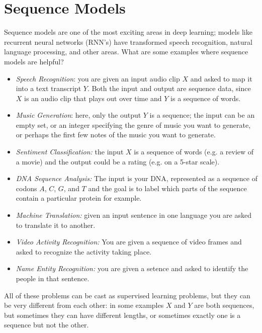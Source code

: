 \documentclass[12pt]{article}
\begin{document}
\section{Sequence Models}
Sequence models are one of the most exciting areas in deep learning; models like recurrent neural networks (RNN's) have transformed speech recognition, natural language processing, and other areas. What are some examples where sequence models are helpful?
\begin{itemize}
\item \emph{Speech Recognition}: you are given an input audio clip $X$ and asked to map it into a text transcript $Y$. Both the input and output are sequence data, since $X$ is an audio clip that plays out over time and $Y$ is a sequence of words.
\item \emph{Music Generation}: here, only the output $Y$ is a sequence; the input can be an empty set, or an integer specifying the genre of music you want to generate, or perhaps the first few notes of the music you want to generate.
\item \emph{Sentiment Classification:} the input $X$ is a sequence of words (e.g. a review of a movie) and the output could be a rating (e.g. on a 5-star   scale).
\item \emph{DNA Sequence Analysis:} The input is your DNA, represented as a sequence of codons $A$, $C$, $G$, and $T$ and the goal is to label which parts of the sequence contain a particular protein for example.
\item \emph{Machine Translation:} given an input sentence in one language you are asked to translate it to another.
\item \emph{Video Activity Recognition:} You are given a sequence of video   frames and asked to recognize the activity taking place.
\item \emph{Name Entity Recognition:} you are given a setence and asked to identify the people in that sentence.
\end{itemize}
All of these problems can be cast as supervised learning problems, but they can be very different from each other: in some examples $X$ and $Y$ are both sequences, but sometimes they can have different lengths, or sometimes exactly one is a sequence but not the other.
\end{document}
